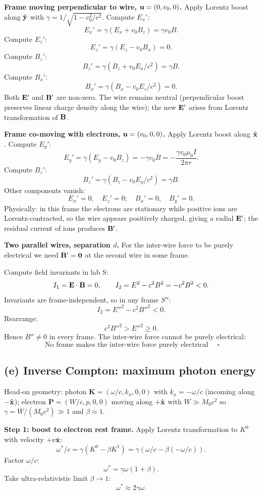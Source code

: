\documentclass[11pt]{article}
\begin{document}
\textbf{Frame moving perpendicular to wire, $\vb u = (0,v_0,0)$.} Apply Lorentz boost along $\hat{\vb y}$ with $\gamma = 1/\sqrt{1-v_0^2/c^2}$. Compute $E_x'$:
\[
E_x' = \gamma(E_x + v_0 B_z) = \gamma v_0 B.
\]
Compute $E_z'$:
\[
E_z' = \gamma(E_z - v_0 B_x) = 0.
\]
Compute $B_z'$:
\[
B_z' = \gamma(B_z + v_0 E_x/c^2) = \gamma B.
\]
Compute $B_x'$:
\[
B_x' = \gamma(B_x - v_0 E_z/c^2) = 0.
\]
Both $\vb E'$ and $\vb B'$ are non-zero. The wire remains neutral (perpendicular boost preserves linear charge density along the wire); the new $\vb E'$ arises from Lorentz transformation of $\vb B$.

\textbf{Frame co-moving with electrons, $\vb u=(v_0,0,0)$.} Apply Lorentz boost along $\hat{\vb x}$. Compute $E_y'$:
\[
E_y' = \gamma(E_y - v_0 B_z) = -\gamma v_0 B = -\frac{\gamma v_0\mu_0 I}{2\pi r}.
\]
Compute $B_z'$:
\[
B_z' = \gamma(B_z - v_0 E_y/c^2) = \gamma B.
\]
Other components vanish:
\[
E_x' = 0,\quad E_z' = 0;\quad B_x'=0,\quad B_y'=0.
\]
Physically: in this frame the electrons are stationary while positive ions are Lorentz-contracted, so the wire appears positively charged, giving a radial $\vb E'$; the residual current of ions produces $\vb B'$.

\textbf{Two parallel wires, separation $d$.} For the inter-wire force to be purely electrical we need $\vb B'=\vb 0$ at the second wire in some frame.

Compute field invariants in lab S:
\[
I_1 = \vb E\cdot\vb B = 0,\qquad I_2 = E^2 - c^2 B^2 = -c^2 B^2 < 0.
\]
Invariants are frame-independent, so in any frame $S''$:
\[
I_2 = E''^2 - c^2 B''^2 < 0.
\]
Rearrange:
\[
c^2 B''^2 > E''^2 \geq 0.
\]
Hence $B''\neq 0$ in every frame. The inter-wire force cannot be purely electrical:
\[
\boxed{\;\text{No frame makes the inter-wire force purely electrical}\;}\quad\square
\]

\subsection*{(e) Inverse Compton: maximum photon energy}

Head-on geometry: photon $\bm K=(\omega/c,k_x,0,0)$ with $k_x=-\omega/c$ (incoming along $-\hat{\vb x}$); electron $\bm P=(W/c,p,0,0)$ moving along $+\hat{\vb x}$ with $W\gg M_0 c^2$ so $\gamma = W/(M_0c^2)\gg 1$ and $\beta\approx 1$.

\textbf{Step 1: boost to electron rest frame.} Apply Lorentz transformation to $K^0$ with velocity $+v\hat{\vb x}$:
\[
\omega^*/c = \gamma(K^0 - \beta K^1) = \gamma(\omega/c - \beta(-\omega/c)).
\]
Factor $\omega/c$:
\[
\omega^* = \gamma\omega(1+\beta).
\]
Take ultra-relativistic limit $\beta\to 1$:
\[
\omega^* \approx 2\gamma\omega.
\]
\end{document}
